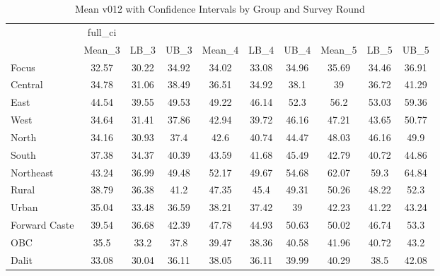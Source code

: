 \begin{table}[htbp]\centering
\caption{Mean v012 with Confidence Intervals by Group and Survey Round}
\begin{tabular}{l*{9}{c}}
\toprule
                    &     full\_ci&            &            &            &            &            &            &            &            \\
                    &      Mean\_3&        LB\_3&        UB\_3&      Mean\_4&        LB\_4&        UB\_4&      Mean\_5&        LB\_5&        UB\_5\\
\midrule
Focus               &       32.57&       30.22&       34.92&       34.02&       33.08&       34.96&       35.69&       34.46&       36.91\\
Central             &       34.78&       31.06&       38.49&       36.51&       34.92&        38.1&          39&       36.72&       41.29\\
East                &       44.54&       39.55&       49.53&       49.22&       46.14&        52.3&        56.2&       53.03&       59.36\\
West                &       34.64&       31.41&       37.86&       42.94&       39.72&       46.16&       47.21&       43.65&       50.77\\
North               &       34.16&       30.93&        37.4&        42.6&       40.74&       44.47&       48.03&       46.16&        49.9\\
South               &       37.38&       34.37&       40.39&       43.59&       41.68&       45.49&       42.79&       40.72&       44.86\\
Northeast           &       43.24&       36.99&       49.48&       52.17&       49.67&       54.68&       62.07&        59.3&       64.84\\
Rural               &       38.79&       36.38&        41.2&       47.35&        45.4&       49.31&       50.26&       48.22&        52.3\\
Urban               &       35.04&       33.48&       36.59&       38.21&       37.42&          39&       42.23&       41.22&       43.24\\
Forward Caste       &       39.54&       36.68&       42.39&       47.78&       44.93&       50.63&       50.02&       46.74&        53.3\\
OBC                 &        35.5&        33.2&        37.8&       39.47&       38.36&       40.58&       41.96&       40.72&        43.2\\
Dalit               &       33.08&       30.04&       36.11&       38.05&       36.11&       39.99&       40.29&        38.5&       42.08\\

\end{tabular}
\end{table}
